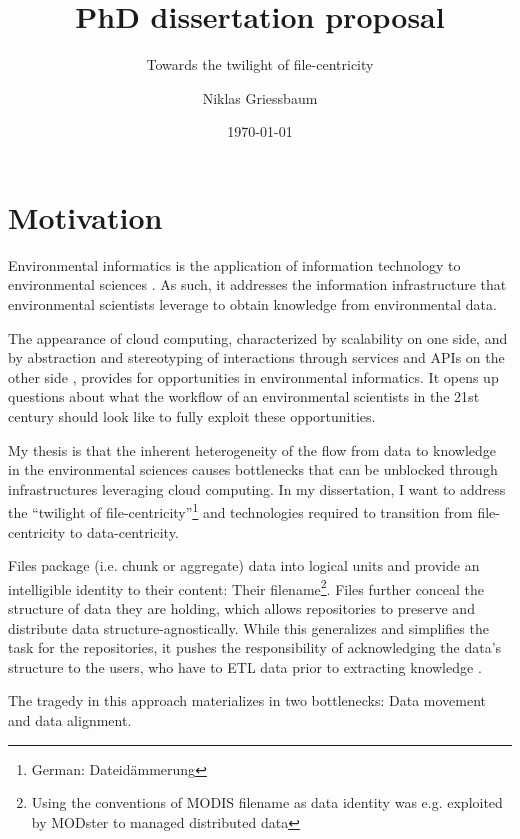 \documentclass[letterpaper, parskip=half]{scrartcl}
\title{PhD dissertation proposal}
\subtitle{Towards the twilight of file-centricity}
\author{Niklas Griessbaum}
\date{\today}
\begin{document}
\maketitle

\newpage
\tableofcontents

\newpage
\printglossaries


\newpage

\section{Motivation}

Environmental informatics is the application of information technology to environmental sciences \citep{Frew2012}.
As such, it addresses the information infrastructure that environmental scientists leverage
to obtain knowledge from environmental data.

The appearance of cloud computing, characterized by scalability on one side, 
and by abstraction and stereotyping of interactions through services and \glspl{API} on the other side \citep{Foster2017}, 
provides for opportunities in environmental informatics. 
It opens up questions about what the workflow of an environmental scientists in the 21st century should look like to fully exploit these opportunities.

My thesis is that the inherent heterogeneity of the flow from data to knowledge in the environmental sciences causes bottlenecks that can be unblocked through infrastructures leveraging cloud computing. 
In my dissertation, I want to address the ``twilight of file-centricity''\footnote{German: Dateidämmerung } and technologies required to transition from file-centricity to data-centricity.

Files package (i.e. chunk or aggregate) data into logical units and provide an intelligible identity to their content: Their filename\footnote{Using the conventions of \gls{MODIS} filename as data identity was e.g. exploited by MODster \citep{Frew2005, Frew2002} to managed distributed data}.
Files further conceal the structure of data they are holding, which allows repositories to preserve and distribute data structure-agnostically. 
While this generalizes and simplifies the task for the repositories, it pushes the responsibility of acknowledging the data's structure to the users, who have to \gls{ETL} data prior to extracting knowledge \citep{Rilee2016, Szalay2009}.

The tragedy in this approach materializes in two bottlenecks: Data movement and data alignment.
\end{document}
